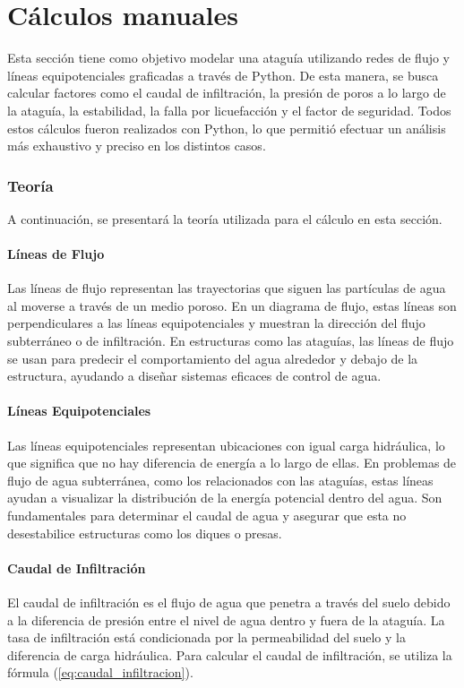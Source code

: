 \part{Cálculos manuales}

Esta sección tiene como objetivo modelar una ataguía utilizando redes de flujo y líneas equipotenciales graficadas a través de Python. De esta manera, se busca calcular factores como el caudal de infiltración, la presión de poros a lo largo de la ataguía, la estabilidad, la falla por licuefacción y el factor de seguridad. Todos estos cálculos fueron realizados con Python, lo que permitió efectuar un análisis más exhaustivo y preciso en los distintos casos.

\section{Teoría}

A continuación, se presentará la teoría utilizada para el cálculo en esta sección.

\subsection{Líneas de Flujo}
Las líneas de flujo representan las trayectorias que siguen las partículas de agua al moverse a través de un medio poroso. En un diagrama de flujo, estas líneas son perpendiculares a las líneas equipotenciales y muestran la dirección del flujo subterráneo o de infiltración. En estructuras como las ataguías, las líneas de flujo se usan para predecir el comportamiento del agua alrededor y debajo de la estructura, ayudando a diseñar sistemas eficaces de control de agua. \textbf{\cite{structville}}

\subsection{Líneas Equipotenciales}
Las líneas equipotenciales representan ubicaciones con igual carga hidráulica, lo que significa que no hay diferencia de energía a lo largo de ellas. En problemas de flujo de agua subterránea, como los relacionados con las ataguías, estas líneas ayudan a visualizar la distribución de la energía potencial dentro del agua. Son fundamentales para determinar el caudal de agua y asegurar que esta no desestabilice estructuras como los diques o presas. \textbf{\cite{structville}}

\subsection{Caudal de Infiltración}
El caudal de infiltración es el flujo de agua que penetra a través del suelo debido a la diferencia de presión entre el nivel de agua dentro y fuera de la ataguía. La tasa de infiltración está condicionada por la permeabilidad del suelo y la diferencia de carga hidráulica. Para calcular el caudal de infiltración, se utiliza la fórmula (\ref{eq:caudal_infiltracion}). \textbf{\cite{stability_cofferdam_2024}}

